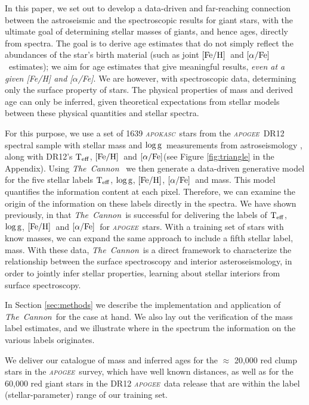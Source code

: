 \documentclass[12pt, preprint]{aastex}
\newcommand{\project}[1]{\textsl{#1}}
\newcommand{\tc}{\project{The~Cannon}}
\newcommand{\apogee}{\project{\textsc{apogee}}}
\newcommand{\apokasc}{\project{\textsc{apokasc}}}
\newcommand{\teff}{\mbox{$\rm T_{eff}$}}
\newcommand{\feh}{\mbox{$\rm [Fe/H]$}}
\newcommand{\alphafe}{\mbox{$\rm [\alpha/Fe]$}}
\newcommand{\logg}{\mbox{$\rm \log g$}}
\begin{document}
In this paper, we set out to develop a data-driven and far-reaching connection between the astroseismic and the spectroscopic results for giant stars, with the ultimate goal of determining stellar masses of giants, and hence ages, directly from spectra. The goal is to derive age estimates that do not simply reflect the abundances of the star's birth material (such as joint \feh\ and \alphafe\ estimates); we aim for age estimates that give meaningful results, {\sl even at a given [Fe/H] and [$\alpha$/Fe]}. We are however, with spectroscopic data, determining only the surface property of stars. The physical properties of mass and derived age can only be inferred, given theoretical expectations from stellar models between these physical quantities and stellar spectra.

For this purpose, we use a set of 1639 \apokasc\ stars from the \apogee\ DR12 spectral sample with stellar mass and \logg\ measurements from astroseismology \citep{P2014}, along with DR12's  \teff, \feh\ and \alphafe (see Figure \ref{fig:triangle} in the Appendix).  Using \tc~ \citep{Ness2015} we then generate a data-driven generative model for the five stellar labels \teff, \logg, \feh, \alphafe\ and mass. This model quantifies the information content at each pixel.  
Therefore, we can examine the origin of the information on these labels directly in the spectra. We have shown previously, in  \citet[][and Ho et al., in prep]{Ness2015}   that \tc\ is successful for delivering the labels of \teff, \logg, \feh\  and \alphafe\ for \apogee\ stars. With a training set of stars with know masses, we can expand the same approach to include a fifth stellar label, mass. With these data,  \tc\ is a direct framework to characterize the relationship between the surface spectroscopy and interior asteroseismology, in order to jointly infer stellar properties, learning about stellar interiors from surface spectroscopy.

In Section \ref{sec:methods} we describe the implementation and application of \tc\ for the case at hand. We also lay out the verification of the mass label estimates, and we illustrate where in the spectrum the information on the various labels originates. 

We deliver our catalogue of mass and inferred ages for the $\approx$ 20,000 red clump stars in the \apogee\ survey, which have well known distances, as well as for the 60,000 red giant stars in the DR12 \apogee\ data release that are within the label (stellar-parameter) range of our training set.
\end{document}
